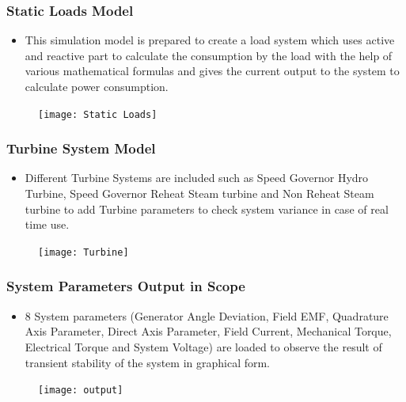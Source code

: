 \documentclass [xcolor=svgnames, t] {beamer}
\begin{document}
	\begin{frame}
	\frametitle{Static Loads Model}
	\begin{itemize} \justifying 
	\item This simulation model is prepared to create a load system which uses active and reactive part to calculate the consumption by the load with the help of various mathematical formulas and gives the current output to the system to calculate power consumption.  
	\end{itemize}
	\begin{figure}
	\texttt{[image: Static Loads]}
	\end{figure}
	\end{frame}
	
	\begin{frame}
	\frametitle{Turbine System Model}
	\begin{itemize} \justifying 
	\item Different Turbine Systems are included such as Speed Governor Hydro Turbine, Speed Governor Reheat Steam turbine and Non Reheat Steam turbine to add Turbine parameters to check system variance in case of real time use.
	\end{itemize}
	\begin{figure}
	\texttt{[image: Turbine]}
	\end{figure}
	\end{frame} 
	
	
	\begin{frame}
	\frametitle{System Parameters Output in Scope}
	\begin{itemize} \justifying 
	\item 8 System parameters (Generator Angle Deviation, Field EMF, Quadrature Axis Parameter, Direct Axis Parameter, Field Current, Mechanical Torque, Electrical Torque and System Voltage) are loaded to observe the result of transient stability of the system in graphical form.
	\end{itemize}
	\begin{figure}
	\texttt{[image: output]}
	\end{figure}
	\end{frame} 
\end{document}
